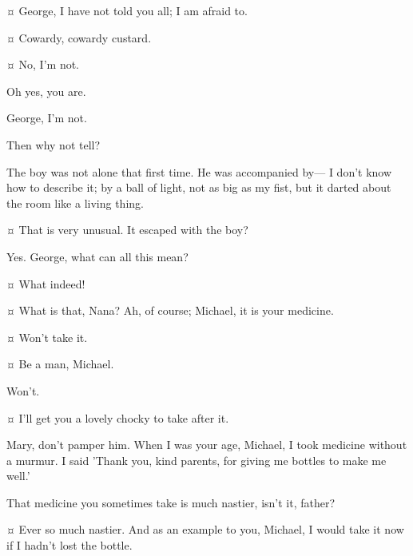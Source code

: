 \begin{drama}
\mrsdarlingspeaks {}¤
George, I have not told you all; I am afraid to.

\mrdarlingspeaks {}¤
Cowardy, cowardy custard.

\mrsdarlingspeaks {}¤
No, I'm not.

\mrdarlingspeaks
Oh yes, you are.

\mrsdarlingspeaks
George, I'm not.

\mrdarlingspeaks
Then why not tell?

\mrsdarlingspeaks
The boy was not alone that first time.
He was accompanied by—%
I don't know how to describe it;
by a ball of light, not as big as my fist, but it darted about the room like a living thing.

\mrdarlingspeaks {}¤
That is very unusual.
It escaped with the boy?

\mrsdarlingspeaks
Yes.
George, what can all this mean?

\mrdarlingspeaks {}¤
What indeed!


\mrsdarlingspeaks {}¤
What is that, Nana?
Ah, of course; Michael, it is your medicine.

\michaelspeaks {}¤
Won't take it.

\mrdarlingspeaks {}¤
Be a man, Michael.

\michaelspeaks
Won't.

\mrsdarlingspeaks {}¤
I'll get you a lovely chocky to take after it.

\mrdarlingspeaks
Mary, don't pamper him.
When I was your age, Michael, I took medicine without a murmur.
I said 'Thank you, kind parents, for giving me bottles to make me well.'


\wendyspeaks
That medicine you sometimes take is much nastier, isn't it, father?

\mrdarlingspeaks {}¤
Ever so much nastier.
And as an example to you, Michael, I would take it now
if I hadn't lost the bottle.


\end{drama}
